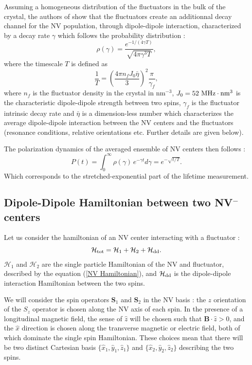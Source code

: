 \documentclass[preprintnumbers,amsmath,amssymb,onecolumn,12pt]{revtex4-2}\usepackage{graphicx}%
\begin{document}
Assuming a homogeneous distribution of the fluctuators in the bulk of the crystal, the authors of \cite{choi_depolarization_2017} show that the fluctuators create an additionnal decay channel for the NV population, through dipole-dipole interaction, characterized by a decay rate $\gamma$ which follows the probability distribution :
\begin{equation}
\rho(\gamma)=\frac{e^{-1/(4\gamma T)}}{\sqrt{4\pi \gamma^3 T}},
\end{equation}
where the timescale $T$ is defined as
\begin{equation}
\frac{1}{T}=\left(\frac{4\pi n_fJ_0\bar \eta}{3}\right)^2 \frac{\pi}{\gamma_f},
\label{eq 1/T}
\end{equation}
where $n_f$ is the fluctuator density in the crystal in nm$^{-3}$, $J_0=52\ \rm{MHz}\cdot\rm{nm}^3$ is the characteristic dipole-dipole strength between two spins, $\gamma_f$ is the fluctuator intrinsic decay rate and $\bar \eta$ is a dimension-less number which characterizes the average dipole-dipole interaction between the NV centers and the fluctuators (resonance conditions, relative orientations etc. Further details are given below).

The polarization dynamics of the averaged ensemble of NV centers then follows :
\begin{equation}
P(t)=\int_0^\infty \rho(\gamma)\, e^{-\gamma t}d\gamma= e^{-\sqrt{t/T}}.
\end{equation}
Which corresponds to the stretched-exponential part of the lifetime measurement.
\subsection{Dipole-Dipole Hamiltonian between two NV$^-$ centers}
Let us consider the hamiltonian of an NV center interacting with a fluctuator :
\begin{equation}
\mathcal{H}_{\rm tot}=\mathcal{H}_{1}+\mathcal{H}_2+\mathcal{H}_{\rm dd}.
\end{equation}
$\mathcal{H}_{1}$ and $\mathcal{H}_{2}$ are the single particle Hamiltonian of the NV and fluctuator, described by the equation (\ref{NV Hamiltonian}), and $\mathcal{H}_{\rm dd}$ is the dipole-dipole interaction Hamiltonian between the two spins. 

We will consider the spin operators $\bm{S}_1$ and
$\bm{S}_2$ in the NV basis : the $z$ orientation of the $S_z$ operator is chosen along the NV axis of each spin. In the presence of a longitudinal magnetic field, the sense of $\hat{z}$ will be chosen such that $\bm{B}\cdot \hat{z} >0$, and the $\hat{x}$ direction is chosen along the transverse magnetic or electric field, both of which dominate the single spin Hamiltonian. These choices mean that there will be two distinct Cartesian basis $\{\hat{x}_1,\hat{y}_1,\hat{z}_1\}$ and $\{\hat{x}_2,\hat{y}_2,\hat{z}_2\}$ describing the two spins.
\end{document}
